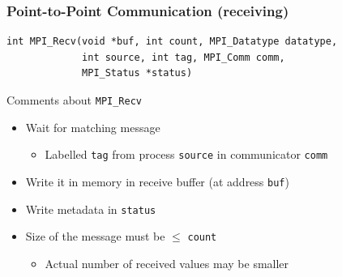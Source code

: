 \documentclass[xcolor={x11names,svgnames,psnames}]{beamer}
\begin{document}
\begin{frame}[fragile=singleslide]
  \frametitle{Point-to-Point Communication (receiving)}

\begin{verbatim}
int MPI_Recv(void *buf, int count, MPI_Datatype datatype,
             int source, int tag, MPI_Comm comm,
             MPI_Status *status)
\end{verbatim}

  \begin{block}{Comments about \texttt{MPI_Recv}}
    \begin{itemize}
    \item Wait for \alert{matching} message
      \begin{itemize}
      \item Labelled \texttt{tag} from process \texttt{source} in communicator \texttt{comm}
      \end{itemize}
    \item Write it in memory in \alert{receive buffer} (at address \texttt{buf})
    \item Write metadata in \texttt{status}
    \item Size of the message must be $\leq$ \texttt{count}
      \begin{itemize}
      \item Actual number of received values may be smaller
      \end{itemize}    
    \end{itemize}
  \end{block}
\end{frame}

\end{document}

